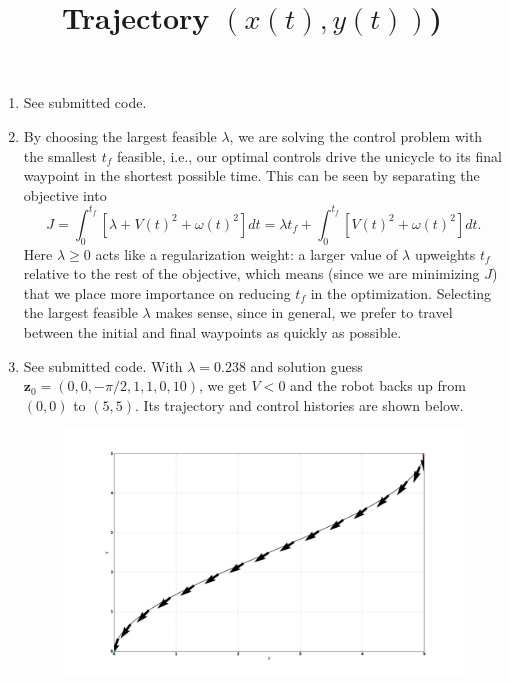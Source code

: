 \documentclass[12pt]{article}
\begin{document}
\begin{enumerate}
\begin{equation}
\begin{array}{c}
		V \\
		\omega
		\end{array}\right) :=
		-\frac{1}{2}\left(\begin{array}{c}
		z_4\cos(z_3) + z_5\sin(z_3) \\
		z_6
		\end{array}\right)
	\end{equation}
	\item See submitted code.
	\item By choosing the largest feasible $\lambda$, we are solving the control problem with the smallest $t_f$ feasible, i.e., our optimal controls drive the unicycle to its final waypoint in the shortest possible time. This can be seen by separating the objective into
	\[
		J = \int_0^{t_f} [\lambda + V(t)^2 + \omega(t)^2]dt = \lambda t_f + \int_0^{t_f} [V(t)^2 + \omega(t)^2]dt.
	\]
	Here $\lambda \geq 0$ acts like a regularization weight: a larger value of $\lambda$ upweights $t_f$ relative to the rest of the objective, which means (since we are minimizing $J$) that we place more importance on reducing $t_f$ in the optimization. Selecting the largest feasible $\lambda$ makes sense, since in general, we prefer to travel between the initial and final waypoints as quickly as possible.
	\item See submitted code. With $\lambda = 0.238$ and solution guess $\mathbf{z}_0 = (0, 0, -\pi/2, 1, 1, 0, 10)$, we get $V < 0$ and the robot backs up from $(0,0)$ to $(5,5)$. Its trajectory and control histories are shown below.
	\begin{figure}[H]
		\centering
		\title{\bf Trajectory $(x(t), y(t))$)}
		\includegraphics[width=\textwidth]{../Figures/hw1_1_iv_a.png}
	\end{figure}
	\begin{figure}[H]

\end{figure}
\end{enumerate}
\end{document}
